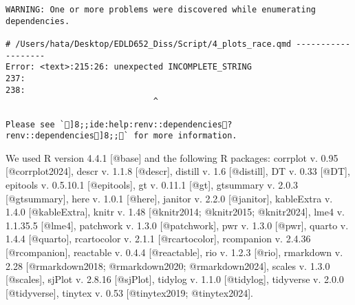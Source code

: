 \documentclass[
  letterpaper,
  DIV=11,
  numbers=noendperiod]{scrartcl}
\begin{document}
\newpage

\begin{verbatim}
WARNING: One or more problems were discovered while enumerating dependencies.

# /Users/hata/Desktop/EDLD652_Diss/Script/4_plots_race.qmd -------------------
Error: <text>:215:26: unexpected INCOMPLETE_STRING
237: 
238: 
                              ^

Please see `]8;;ide:help:renv::dependencies?renv::dependencies]8;;` for more information.
\end{verbatim}

We used R version 4.4.1 {[}@base{]} and the following R packages:
corrplot v. 0.95 {[}@corrplot2024{]}, descr v. 1.1.8 {[}@descr{]},
distill v. 1.6 {[}@distill{]}, DT v. 0.33 {[}@DT{]}, epitools v.
0.5.10.1 {[}@epitools{]}, gt v. 0.11.1 {[}@gt{]}, gtsummary v. 2.0.3
{[}@gtsummary{]}, here v. 1.0.1 {[}@here{]}, janitor v. 2.2.0
{[}@janitor{]}, kableExtra v. 1.4.0 {[}@kableExtra{]}, knitr v. 1.48
{[}@knitr2014; @knitr2015; @knitr2024{]}, lme4 v. 1.1.35.5 {[}@lme4{]},
patchwork v. 1.3.0 {[}@patchwork{]}, pwr v. 1.3.0 {[}@pwr{]}, quarto v.
1.4.4 {[}@quarto{]}, rcartocolor v. 2.1.1 {[}@rcartocolor{]}, rcompanion
v. 2.4.36 {[}@rcompanion{]}, reactable v. 0.4.4 {[}@reactable{]}, rio v.
1.2.3 {[}@rio{]}, rmarkdown v. 2.28 {[}@rmarkdown2018; @rmarkdown2020;
@rmarkdown2024{]}, scales v. 1.3.0 {[}@scales{]}, sjPlot v. 2.8.16
{[}@sjPlot{]}, tidylog v. 1.1.0 {[}@tidylog{]}, tidyverse v. 2.0.0
{[}@tidyverse{]}, tinytex v. 0.53 {[}@tinytex2019; @tinytex2024{]}.
\end{document}
